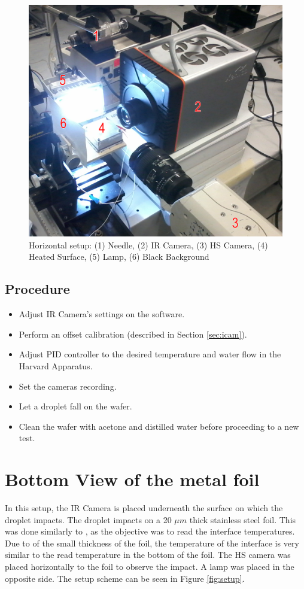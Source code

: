 \begin{figure}[h]
\centering
\includegraphics[width=0.65\linewidth]{Figures/3.Chapter/horizontal.png}
\caption{Horizontal setup: (1) Needle, (2) IR Camera, (3) HS Camera, (4) Heated Surface, (5) Lamp, (6) Black Background}
\label{fig:horizontal}
\end{figure}

\subsection{Procedure}
\label{sec:procedure}
\begin{itemize}
\item Adjust IR Camera's settings on the software.
\item Perform an offset calibration (described in Section \ref{sec:icam}).
\item Adjust PID controller to the desired temperature and water flow in the Harvard Apparatus.
\item Set the cameras recording.
\item Let a droplet fall on the wafer.
\item Clean the wafer with acetone and distilled water before proceeding to a new test.
\end{itemize}

\section{Bottom View of the metal foil}

\par In this setup, the IR Camera is placed underneath the surface on which the droplet impacts. The droplet impacts on a 20 $\mu m$ thick stainless steel foil. This was done similarly to \cite{sielaff2014experimental}, as the objective was to read the interface temperatures. Due to of the small thickness of the foil, the temperature of the interface is very similar to the read temperature in the bottom of the foil. The HS camera was placed horizontally to the foil to observe the impact. A lamp was placed in the opposite side. The setup scheme can be seen in Figure \ref{fig:setup}.\\

